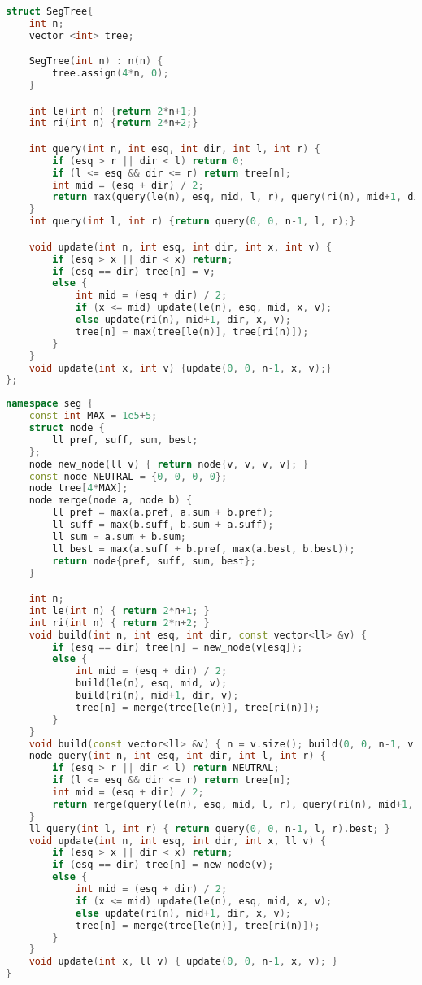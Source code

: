 \documentclass[11pt, a4paper, twoside]{article}
\begin{document}
\begin{lstlisting}[language=C++]
struct SegTree{
    int n;
    vector <int> tree;

    SegTree(int n) : n(n) {
        tree.assign(4*n, 0);
    }

    int le(int n) {return 2*n+1;}
    int ri(int n) {return 2*n+2;}

    int query(int n, int esq, int dir, int l, int r) {
        if (esq > r || dir < l) return 0;
        if (l <= esq && dir <= r) return tree[n];
        int mid = (esq + dir) / 2;
        return max(query(le(n), esq, mid, l, r), query(ri(n), mid+1, dir, l, r));
    }
    int query(int l, int r) {return query(0, 0, n-1, l, r);}

    void update(int n, int esq, int dir, int x, int v) {
        if (esq > x || dir < x) return;
        if (esq == dir) tree[n] = v;
        else {
            int mid = (esq + dir) / 2;
            if (x <= mid) update(le(n), esq, mid, x, v);
            else update(ri(n), mid+1, dir, x, v);
            tree[n] = max(tree[le(n)], tree[ri(n)]);
        }
    }
    void update(int x, int v) {update(0, 0, n-1, x, v);}
};
\end{lstlisting}

\begin{lstlisting}[language=C++]
namespace seg {
    const int MAX = 1e5+5;
    struct node {
        ll pref, suff, sum, best;
    };
    node new_node(ll v) { return node{v, v, v, v}; }
    const node NEUTRAL = {0, 0, 0, 0};
    node tree[4*MAX];
    node merge(node a, node b) {
        ll pref = max(a.pref, a.sum + b.pref);
        ll suff = max(b.suff, b.sum + a.suff);
        ll sum = a.sum + b.sum;
        ll best = max(a.suff + b.pref, max(a.best, b.best));
        return node{pref, suff, sum, best};
    }

    int n;
    int le(int n) { return 2*n+1; }
    int ri(int n) { return 2*n+2; }
    void build(int n, int esq, int dir, const vector<ll> &v) {
        if (esq == dir) tree[n] = new_node(v[esq]);
        else {
            int mid = (esq + dir) / 2;
            build(le(n), esq, mid, v);
            build(ri(n), mid+1, dir, v);
            tree[n] = merge(tree[le(n)], tree[ri(n)]);
        }
    }
    void build(const vector<ll> &v) { n = v.size(); build(0, 0, n-1, v); }
    node query(int n, int esq, int dir, int l, int r) {
        if (esq > r || dir < l) return NEUTRAL;
        if (l <= esq && dir <= r) return tree[n];
        int mid = (esq + dir) / 2;
        return merge(query(le(n), esq, mid, l, r), query(ri(n), mid+1, dir, l, r));
    }
    ll query(int l, int r) { return query(0, 0, n-1, l, r).best; }
    void update(int n, int esq, int dir, int x, ll v) {
        if (esq > x || dir < x) return;
        if (esq == dir) tree[n] = new_node(v);
        else {
            int mid = (esq + dir) / 2;
            if (x <= mid) update(le(n), esq, mid, x, v);
            else update(ri(n), mid+1, dir, x, v);
            tree[n] = merge(tree[le(n)], tree[ri(n)]);
        }
    }
    void update(int x, ll v) { update(0, 0, n-1, x, v); }
}
\end{lstlisting}
\end{document}
